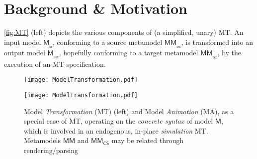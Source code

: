 \section{Background \& Motivation}
\label{sec:Motivation}

\autoref{fig:MT} (left) depicts the various components of (a simplified, unary) MT. 
An input model $\mathsf{M}_{_{\mathsf{in}}}$, conforming to a source metamodel 
$\mathsf{MM}_{_{\mathsf{src}}}$, is transformed into an output model 
$\mathsf{M}_{_{\mathsf{out}}}$, hopefully conforming to a target metamodel
$\mathsf{MM}_{_{\mathsf{tgt}}}$, by the execution of an MT specification.

\begin{figure}[t]%
   \begin{minipage}[t]{0.46\columnwidth}
      \texttt{[image: ModelTransformation.pdf]}
   \end{minipage}
   \hfill
   \begin{minipage}[b]{0.53\columnwidth}
   \texttt{[image: ModelTransformation.pdf]}%
   \end{minipage}
   \caption{Model \emph{Transformation} (MT) (left) and Model \emph{Animation} (MA),
   as a special case of MT, operating on the \emph{concrete syntax} of model $\mathsf{M}$,
   which is involved in an endogenous, in-place \emph{simulation} MT. Metamodels
   $\mathsf{MM}$ and $\mathsf{MM}_{\mathsf{CS}}$ may be related through rendering/parsing}%
   \label{fig:MT}%
\end{figure}


